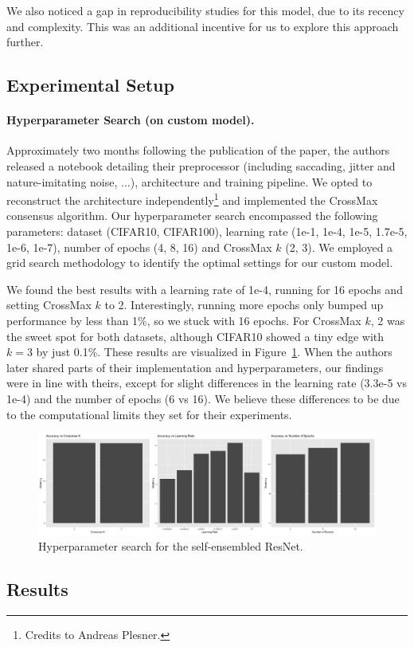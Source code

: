 \documentclass[a4paper, oneside]{discothesis}
\begin{document}
We also noticed a gap in reproducibility studies for this model, due to its recency and complexity. This was an additional incentive for us to explore this approach further.

\subsection{Experimental Setup}

\paragraph{Hyperparameter Search (on custom model).}

Approximately two months following the publication of the paper, the authors released a notebook detailing their preprocessor (including saccading, jitter and nature-imitating noise, ...), architecture and training pipeline. We opted to reconstruct the architecture independently\footnote{Credits to Andreas Plesner.} and implemented the CrossMax consensus algorithm. Our hyperparameter search encompassed the following parameters: dataset (CIFAR10, CIFAR100), learning rate (1e-1, 1e-4, 1e-5, 1.7e-5, 1e-6, 1e-7), number of epochs (4, 8, 16) and CrossMax $k$ (2, 3). We employed a grid search methodology to identify the optimal settings for our custom model.

We found the best results with a learning rate of 1e-4, running for 16 epochs and setting CrossMax $k$ to 2. Interestingly, running more epochs only bumped up performance by less than 1\%, so we stuck with 16 epochs. For CrossMax $k$, 2 was the sweet spot for both datasets, although CIFAR10 showed a tiny edge with $k=3$ by just 0.1\%. These results are visualized in Figure~\ref{fig:se-hyperparams}. When the authors later shared parts of their implementation and hyperparameters, our findings were in line with theirs, except for slight differences in the learning rate (3.3e-5 vs 1e-4) and the number of epochs (6 vs 16). We believe these differences to be due to the computational limits they set for their experiments.

\begin{figure}
	\centering
	\includegraphics[width=1\columnwidth]{figures/self-ensemble-hyperparams.png}
	\caption{Hyperparameter search for the self-ensembled ResNet.}
	\label{fig:se-hyperparams}
\end{figure}


\subsection{Results}


\bigskip



\end{document}
